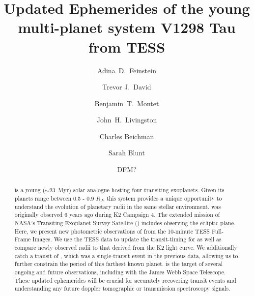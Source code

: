 \documentclass[twocolumn]{aastex631}
\begin{document}
\title{Updated Ephemerides of the young multi-planet system V1298 Tau from TESS}

\author[0000-0002-9464-8101]{Adina~D.~Feinstein}

\author[0000-0001-6534-6246]{Trevor J.\ David}

\author[0000-0001-7516-8308]{Benjamin~T.~Montet}

\author[0000-0002-4881-3620]{John~H.~Livingston}

\author{Charles Beichman}


\author[0000-0002-3199-2888]{Sarah Blunt}


\author{DFM?}

  

\begin{abstract}
  \sname is a young ($\sim$23~Myr) solar analogue hosting four transiting exoplanets. 
  Given its planets range between 0.5 - 0.9 $R_J$, this system provides a unique opportunity to 
  understand the evolution of planetary radii in the same stellar environment. \sname was originally 
  observed 6 years ago during K2 Campaign 4. The extended mission of NASA's Transiting Exoplanet Survey 
  Satellite (\tess) includes observing the ecliptic plane. Here, we present new photometric observations 
  of \sname from the 10-minute TESS Full-Frame Images. We use the TESS data to update the transit-timing 
  for \allplanets as well as compare newly observed radii to that derived from the K2 light curve. We 
  additionally catch a transit of \planete, which was a single-transit event in the previous data, allowing 
  us to further constrain the period of this farthest known planet. \sname is the target of several ongoing 
  and future observations, including with the James Webb Space Telescope. These updated ephemerides will be 
  crucial for accurately recovering transit events and understanding any future doppler tomographic or 
  transmission spectroscopy signals.

\end{abstract}
\end{document}
